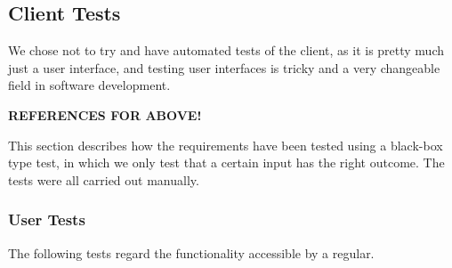 \subsection{Client Tests}

We
chose not to try and have automated tests of the client, as it is pretty much
just a user interface, and testing user interfaces is tricky and a very
changeable field in software development.

\textbf{REFERENCES FOR ABOVE!}

This section describes how the requirements have been tested using a black-box type test, in which we only test that a certain input has the right outcome. The tests were all carried out manually.

\subsubsection{User Tests}
The following tests regard the functionality accessible by a regular. \\
